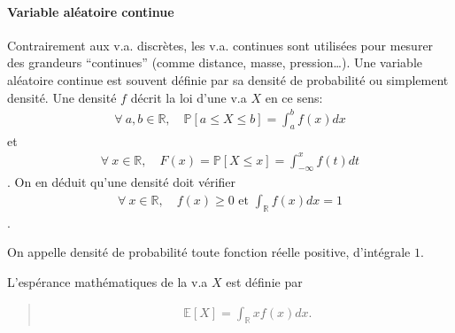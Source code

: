 \documentclass[letterpaper,11pt,english]{sphinxmanual}
\begin{document}
\paragraph{Variable aléatoire continue}
\label{\detokenize{chapter2:variable-aleatoire-continue}}
\sphinxAtStartPar
Contrairement aux v.a. discrètes, les v.a. continues sont utilisées pour
mesurer des grandeurs “continues” (comme distance, masse, pression…).
Une variable aléatoire continue est souvent définie par sa densité de
probabilité ou simplement densité. Une densité \(f\) décrit la loi
d’une v.a \(X\) en ce sens:
\begin{equation}\label{equation:chapter2:chapter2:46}
\begin{split}\forall\  a,b \in \mathbb{R}, \quad \mathbb{P}[a\leq X \leq b] = \int_{a}^{b} f(x)dx\end{split}
\end{equation}
\sphinxAtStartPar
et
\begin{equation}\label{equation:chapter2:chapter2:47}
\begin{split}\forall\  x\in \mathbb{R}, \quad F(x) = \mathbb{P}[X\leq x] =  \int_{-\infty}^{x} f(t)dt\end{split}
\end{equation}
\sphinxAtStartPar
. On en déduit qu’une densité doit vérifier
\begin{equation}\label{equation:chapter2:chapter2:48}
\begin{split}\forall\  x\in \mathbb{R}, \quad f(x)\geq 0 \text{ et } \int_{\mathbb{R}}^{} f(x)dx = 1\end{split}
\end{equation}
\sphinxAtStartPar
.

\begin{DUlineblock}{0em}
\item[] 
\item[] On appelle densité de probabilité toute fonction réelle positive,
d’intégrale \(1\).
\end{DUlineblock}

\begin{DUlineblock}{0em}
\item[] 
\item[] L’espérance mathématiques de la v.a \(X\) est définie par
\end{DUlineblock}
\begin{quote}
\begin{equation}\label{equation:chapter2:chapter2:49}
\begin{split}\mathbb{E}[X]=\int_{\mathbb{R}}^{} xf(x)dx.\end{split}
\end{equation}\end{quote}
\end{document}
